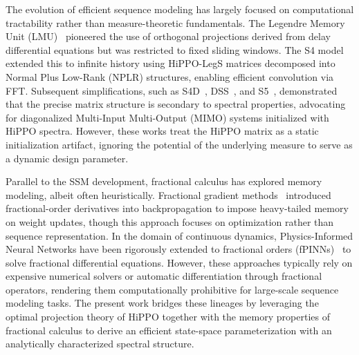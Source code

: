 \documentclass{article}
\theoremstyle{plain}
\theoremstyle{definition}
\theoremstyle{remark}
\begin{document}
The evolution of efficient sequence modeling has largely focused on computational tractability rather than measure-theoretic fundamentals. The Legendre Memory Unit (LMU)~\citep{voelker2019legendre} pioneered the use of orthogonal projections derived from delay differential equations but was restricted to fixed sliding windows. The S4 model~\citep{gu2022efficiently} extended this to infinite history using HiPPO-LegS matrices decomposed into Normal Plus Low-Rank (NPLR) structures, enabling efficient convolution via FFT. Subsequent simplifications, such as S4D~\citep{gu2022parameterization}, DSS~\citep{gupta2022diagonal}, and S5~\citep{smith2023simplified}, demonstrated that the precise matrix structure is secondary to spectral properties, advocating for diagonalized Multi-Input Multi-Output (MIMO) systems initialized with HiPPO spectra. However, these works treat the HiPPO matrix as a static initialization artifact, ignoring the potential of the underlying measure to serve as a dynamic design parameter.

Parallel to the SSM development, fractional calculus has explored memory modeling, albeit often heuristically. 
Fractional gradient methods~\citep{wang2017fractional} introduced fractional-order derivatives into backpropagation to impose heavy-tailed memory on weight updates, though this approach focuses on optimization rather than sequence representation. 
In the domain of continuous dynamics, Physics-Informed Neural Networks have been rigorously extended to fractional orders (fPINNs)~\citep{pang2019fpinns} to solve fractional differential equations. 
However, these approaches typically rely on expensive numerical solvers or automatic differentiation through fractional operators, rendering them computationally prohibitive for large-scale sequence modeling tasks. 
The present work bridges these lineages by leveraging the optimal projection theory of HiPPO together with the memory properties of fractional calculus to derive an efficient state-space parameterization with an analytically characterized spectral structure.
\end{document}
